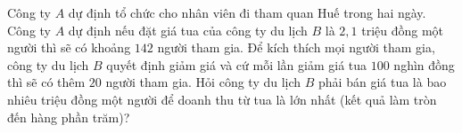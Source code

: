 \begin{ex}%
	Công ty $A$ dự định tổ chức cho nhân viên đi tham quan Huế trong hai ngày. Công ty $A$ dự định nếu đặt giá tua của công ty du lịch $B$ là $2{,}1$ triệu đồng một người thì sẽ có khoảng $142$ người tham gia. Để kích thích mọi người tham gia, công ty du lịch $B$ quyết định giảm giá và cứ mỗi lần giảm giá tua $100$ nghìn đồng thì sẽ có thêm $20$ người tham gia. Hỏi công ty du lịch $B$ phải bán giá tua là bao nhiêu triệu đồng một người để doanh thu từ tua là lớn nhất (kết quả làm tròn đến hàng phần trăm)?
	\par
\end{ex}
